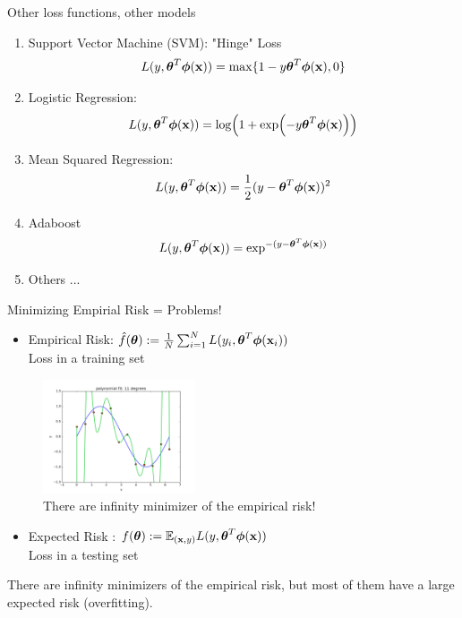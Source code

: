\documentclass[handout,xcolor=pdftex,dvipsnames,table,mathserif]{beamer}
\begin{document}
\begin{frame}{Other loss functions, other models}
\begin{enumerate}
\item Support Vector Machine (SVM): "Hinge" Loss 
\begin{equation}
L(y,\boldsymbol{\theta}^T\boldsymbol{\phi}(\mathbf{x}))=\max \{1-y\boldsymbol{\theta}^T\boldsymbol{\phi}(\mathbf{x}),0\}
\end{equation}
\item Logistic Regression: 
\begin{equation}
L(y,\boldsymbol{\theta}^T\boldsymbol{\phi}(\mathbf{x}))=\log (1+\exp (-y\boldsymbol{\theta}^T\boldsymbol{\phi}(\mathbf{x})))
\end{equation}
\item Mean Squared Regression:
\begin{equation}
L(y,\boldsymbol{\theta}^T\boldsymbol{\phi}(\mathbf{x}))=\frac{1}{2}(y-\boldsymbol{\theta}^T\boldsymbol{\phi}(\mathbf{x}))^2
\end{equation}
\item Adaboost
\begin{equation}
L(y,\boldsymbol{\theta}^T\boldsymbol{\phi}(\mathbf{x}))=\exp^{ -(y-\boldsymbol{\theta}^T\boldsymbol{\phi}(\mathbf{x}))}
\end{equation}
\item Others ...
\end{enumerate}
\end{frame}

\begin{frame}{Minimizing Empirial Risk = Problems!}
\begin{itemize}
\item Empirical Risk: $\hat{f}(\boldsymbol{\theta}) :=\frac{1}{N} \sum_{i=1}^{N} L(y_i,\boldsymbol{\theta}^T\boldsymbol{\phi} (\mathbf{x}_i))$ \pause \\\alert{Loss in a training set}
\end{itemize}
\begin{figure}[htb]
\includegraphics[width=0.4\textwidth]{../graphics/polyfit_degree_11.png}
\caption{There are infinity minimizer of the empirical risk!}
\end{figure}
 \pause
\begin{itemize}
\item Expected Risk : $f(\boldsymbol{\theta}) := \mathbb{E}_{(\mathbf{x},y)} L(y,\boldsymbol{\theta}^T\boldsymbol{\phi} (\mathbf{x}))$ \pause  \\\alert{Loss in a testing set}
\end{itemize}
There are infinity minimizers of the empirical risk, but most of them have a large expected risk (\alert{overfitting}).
\end{frame}
\end{document}
